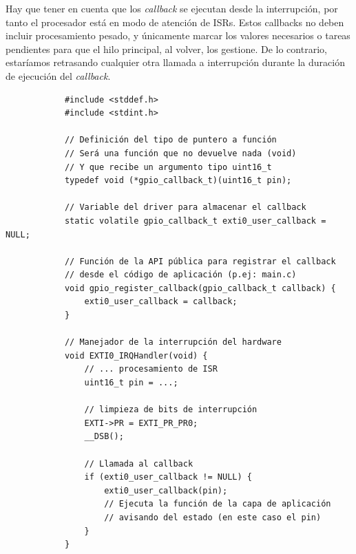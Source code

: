 \documentclass[../main.tex]{subfiles}
\begin{document}
        Hay que tener en cuenta que los \emph{callback} se ejecutan desde la interrupción, por tanto el procesador está en modo de atención de ISRs. Estos callbacks no deben incluir procesamiento pesado, y únicamente marcar los valores necesarios o tareas pendientes para que el hilo principal, al volver, los gestione. De lo contrario, estaríamos retrasando cualquier otra llamada a interrupción durante la duración de ejecución del \emph{callback}.

        \begin{lstlisting}
            #include <stddef.h>
            #include <stdint.h>

            // Definición del tipo de puntero a función 
            // Será una función que no devuelve nada (void)
            // Y que recibe un argumento tipo uint16_t
            typedef void (*gpio_callback_t)(uint16_t pin);

            // Variable del driver para almacenar el callback
            static volatile gpio_callback_t exti0_user_callback = NULL;

            // Función de la API pública para registrar el callback 
            // desde el código de aplicación (p.ej: main.c)
            void gpio_register_callback(gpio_callback_t callback) {
                exti0_user_callback = callback;
            }

            // Manejador de la interrupción del hardware
            void EXTI0_IRQHandler(void) {
                // ... procesamiento de ISR
                uint16_t pin = ...;

                // limpieza de bits de interrupción
                EXTI->PR = EXTI_PR_PR0;
                __DSB();

                // Llamada al callback
                if (exti0_user_callback != NULL) {
                    exti0_user_callback(pin); 
                    // Ejecuta la función de la capa de aplicación
                    // avisando del estado (en este caso el pin)
                }
            }
        \end{lstlisting}
\end{document}
